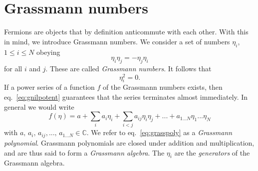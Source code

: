 \section{Grassmann numbers}
Fermions are objects that by definition anticommute with each other. 
With this in mind, we introduce Grassmann numbers.
We consider a set of numbers $\eta_i$, $1\leq i\leq N$ obeying
\begin{equation}
  \eta_i\eta_j=-\eta_j\eta_i
\end{equation}
for all $i$ and $j$. These are called {\it Grassmann numbers}.
It follows that
\begin{equation}\label{eq:gnilpotent}
  \eta_i^2=0.
\end{equation}
If a power series of a function $f$ of the Grassmann numbers exists, then
eq.~\eqref{eq:gnilpotent} guarantees that the series terminates almost
immediately. In general we would write
\begin{equation}\label{eq:grasspoly}
  f(\eta)=a+\sum_ia_i\eta_i+\sum_{i<j}a_{ij}\eta_i\eta_j
           +...+a_{1...N}\eta_1...\eta_N
\end{equation}
with $a,\,a_i,\,a_{ij},...,\,a_{1...N}\in\mathbb{C}$.
We refer to eq.~\eqref{eq:grasspoly} as a {\it Grassmann polynomial}.
Grassmann polynomials are closed under addition and multiplication,
and are thus said to form a {\it Grassmann algebra}. The $\eta_i$
are the {\it generators} of the Grassmann algebra.

